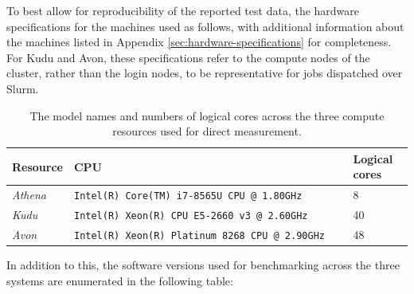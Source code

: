 To best allow for reproducibility of the reported test data, the hardware specifications for the machines used as follows, with additional information about the machines listed in Appendix \ref{sec:hardware-specifications} for completeness. For Kudu and Avon, these specifications refer to the compute nodes of the cluster, rather than the login nodes, to be representative for jobs dispatched over Slurm.

\begin{table}[H]
    \caption{The model names and numbers of logical cores across the three compute resources used for direct measurement.}
    \label{table:compute-resource-cpus}
    \begin{tabular}{|p{0.15\linewidth}||p{0.7\linewidth}|p{0.15\linewidth}|}
    \hline
    \textbf{Resource} & \textbf{CPU}                                            & \textbf{Logical cores} \\ \hline\hline
    \textit{Athena}   & \texttt{Intel(R) Core(TM) i7-8565U CPU @ 1.80GHz}     & 8                      \\ \hline
    \textit{Kudu}     & \texttt{Intel(R) Xeon(R) CPU E5-2660 v3 @ 2.60GHz}    & 40                     \\ \hline
    \textit{Avon}     & \texttt{Intel(R) Xeon(R) Platinum 8268 CPU @ 2.90GHz} & 48                     \\ \hline
    \end{tabular}
\end{table}

In addition to this, the software versions used for benchmarking across the three systems are enumerated in the following table:

